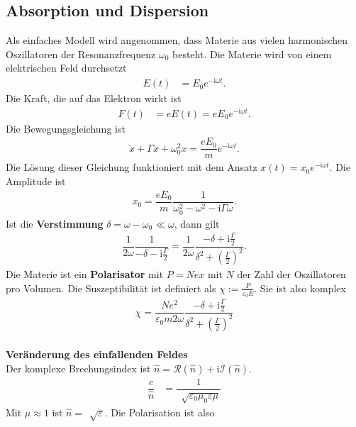 \documentclass[a4paper,12pt]{article}
\numberwithin{equation}{section}
\begin{document}
\subsection{Absorption und Dispersion}
Als einfaches Modell wird angenommen, dass Materie aus vielen harmonischen Oszillatoren der Resonanzfrequenz $\omega _0$ besteht. Die Materie wird von einem elektrischen Feld durchsetzt
\begin{align} 
        E\left(t\right)&=E_0e^{-\text{i}\omega t}
.\end{align} 
Die Kraft, die auf das Elektron wirkt ist
\begin{align} 
        F\left(t\right)&=eE\left(t\right)=eE_0e^{-\text{i}\omega t}
.\end{align} 
Die Bewegungsgleichung ist
\begin{align} 
        \ddot{x}+\Gamma \dot{x}+\omega _0^2x=\dfrac{eE_0}{m}e^{-\text{i}\omega t}
.\end{align} 
Die Lösung dieser Gleichung funktioniert mit dem Ansatz $x\left(t\right)=x_0e^{-\text{i}\omega t}$. Die Amplitude ist
\begin{align} 
        x_0=\dfrac{eE_0}{m}\dfrac{1}{\omega _0^2-\omega ^2-\text{i}\Gamma \omega }
.\end{align} 
Ist die \textbf{Verstimmung} $\delta =\omega -\omega _0\ll \omega $, dann gilt
\begin{align} 
        \dfrac{1}{2\omega }\dfrac{1}{-\delta -\text{i}\tfrac{\Gamma }{2}}=\dfrac{1}{2\omega }\dfrac{-\delta +\text{i}\tfrac{\Gamma }{2}}{\delta ^2+\left(\tfrac{\Gamma }{2}\right)^2}
.\end{align} 
Die Materie ist ein \textbf{Polarisator} mit $P=Nex$ mit $N$ der Zahl der Oszillatoren pro Volumen. Die Suszeptibilität ist definiert als $\chi:=\tfrac{P}{\varepsilon _0E}$. Sie ist also komplex
\begin{align} 
        \chi=\dfrac{Ne^2}{\varepsilon _0m2\omega }\dfrac{-\delta +\text{i}\tfrac{\Gamma }{2}}{\delta ^2+\left(\tfrac{\Gamma }{2}\right)^2}
\end{align} 
\hfill\\\textbf{Veränderung des einfallenden Feldes}\\ 
Der komplexe Brechungsindex ist $\hat{n}=\mathcal{R}\left(\hat{n}\right)+\text{i}\mathcal{I}\left(\hat{n}\right)$.
\begin{align} 
        \dfrac{c}{\hat{n}}&=\dfrac{1}{\,\sqrt[]{\varepsilon _0\mu _0\varepsilon \mu }}
\end{align} 
Mit $\mu \approx 1$ ist $\hat{n}=\,\sqrt[]{\varepsilon }$. Die Polarisation ist also
\end{document}
